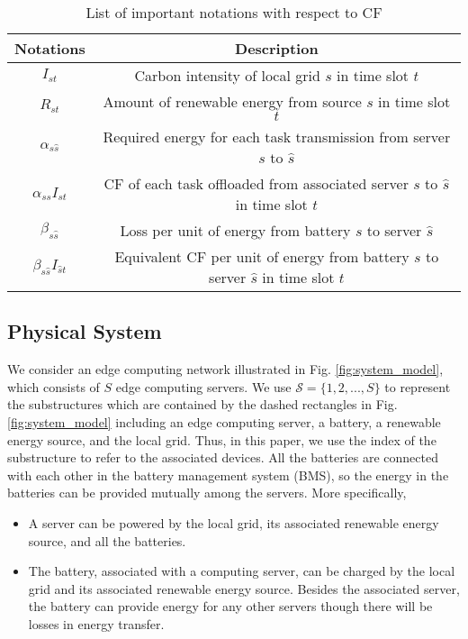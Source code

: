 \documentclass[conference, 10pt, ﬁnal, letterpaper, twocolumn]{IEEEtran}
\begin{document}
\begin{table*}[h]
    \caption{\label{tab:notation}List of important notations with respect to CF}
    \begin{center}
        \begin{tabular}{*{2}{c}}
            \toprule
            \midrule
            {\bf Notations} & {\bf Description} \\
            \midrule
            $I_{st}$ & Carbon intensity of local grid $s$ in time slot $t$ \\
            \midrule
            $R_{st}$ & Amount of renewable energy from source $s$ in time slot $t$ \\
            \midrule
            $\alpha_{{s}\hat{s}}$ & Required energy for each task transmission from server ${s}$ to $\hat{s}$ \\
            \midrule
            $\alpha_{{s}\hat{s}}I_{{s}t}$ & CF of each task offloaded from associated server ${s}$ to $\hat{s}$ in time slot $t$ \\
            \midrule
            $\beta_{{s}\hat{s}}$ & Loss per unit of energy from battery ${s}$ to server $\hat{s}$ \\
            \midrule
            $\beta_{{s}\hat{s}}I_{\hat{s}t}$ & Equivalent CF per unit of energy from battery ${s}$ to server $\hat{s}$ in time slot $t$\\
            \midrule
            \bottomrule
        \end{tabular}
    \end{center}
\end{table*}

\subsection{Physical System}
We consider an edge computing network illustrated in Fig. \ref{fig:system_model}, which consists of $S$ edge computing servers. We use $\mathcal{S} = \{1,2,...,S\}$ to represent the substructures which are contained by the dashed rectangles in Fig. \ref{fig:system_model} including an edge computing server, a battery, a renewable energy source, and the local grid. Thus, in this paper, we use the index of the substructure to refer to the associated devices. All the batteries are connected with each other in the battery management system (BMS), so the energy in the batteries can be provided mutually among the servers. More specifically,  
\begin{itemize}
    \item A server can be powered by the local grid, its associated renewable energy source, and all the batteries. 
    \item The battery, associated with a computing server, can be charged by the local grid and its associated renewable energy source. Besides the associated server, the battery can provide energy for any other servers though there will be losses in energy transfer.
\end{itemize}
\end{document}
